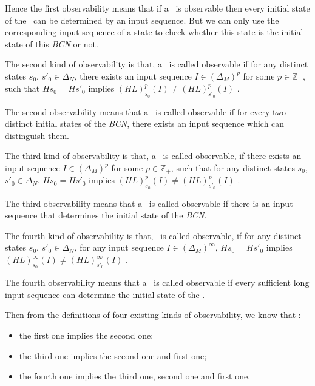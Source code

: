 Hence the first observability means that if a \BCN\ is observable then every initial state of the \BCN\ can be determined by an input sequence. But we can only use the corresponding input sequence of a state to check whether this state is the initial state of this {\em BCN} or not.
\begin{definition}
	The second kind of observability is that, a \BCN\ is called observable if for any distinct states $s_0$, ${s'}_0 \in \Delta_N$, there exists an input sequence $I\in(\Delta_M)^p$ for some $p\in \mathbb{Z}_+$, such that $Hs_0=H{s'}_0$ implies $(HL)^p_{s_0}(I)\neq (HL)^p_{{s'}_0}(I)$ \cite{Zhao2010Input}.
\end{definition}

The second observability means that a \BCN\ is called observable if for every two distinct initial states of the {\em BCN}, there exists an input sequence which can distinguish them. 
\begin{definition}
	The third kind of observability is that, a \BCN\ is called observable, if there exists an input sequence $I\in(\Delta_M)^p$ for some $p\in \mathbb{Z}_+$, such that for any distinct states $s_0$, ${s'}_0 \in \Delta_N$, $Hs_0=H{s'}_0$ implies $(HL)^p_{s_0}(I)\neq (HL)^p_{{s'}_0}(I)$ \cite{Cheng2011Identification}.
\end{definition}

The third observability means that a \BCN\ is called observable if there is an input sequence that determines the initial state of the {\em BCN}.
\begin{definition}
	The fourth kind of observability is that, \BCN\ is called observable, if for any distinct states $s_0$, ${s'}_0 \in \Delta_N$, for any input sequence $I\in(\Delta_M)^{\infty}$, $Hs_0=H{s'}_0$ implies $(HL)^{\infty}_{s_0}(I)\neq (HL)^{\infty}_{{s'}_0}(I)$ \cite{Fornasini2013Observability}.
\end{definition}

The fourth observability means that a \BCN\ is called observable if every sufficient long input sequence can determine the initial state of the \BCN.

Then from the definitions of  four existing kinds of observability, we know that \cite{Zhang2016Observability}:
\begin{itemize}
  \item the first one implies the second one;
  \item the third one implies the second one and first one;
  \item the fourth one implies the third one, second one and first one.
\end{itemize} 
 

